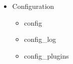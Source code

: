 \documentclass[a4paper, 14pt]{extarticle}
\begin{document}
\begin{itemize}
  \item Configuration
    \begin{itemize}
      \item config
      \item config\_log
      \item config\_plugins
    \end{itemize}


\end{itemize}
\end{document}
